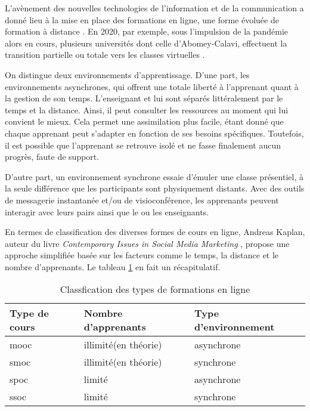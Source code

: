 L'avènement des nouvelles technologies de l’information et de la communication 
a donné lieu à la mise en place des formations en ligne, 
une forme évoluée de formation à distance \cite{online_learning}. 
En 2020, par exemple, sous l’impulsion de la pandémie alors en cours, 
plusieurs universités dont celle d’Abomey-Calavi, 
effectuent la transition partielle ou totale vers les classes virtuelles \cite{etudiant_dot_bj}.

On distingue deux environnements d’apprentissage. 
D’une part, les environnements asynchrones, qui offrent une totale liberté à l'apprenant quant à la gestion de son temps. 
L’enseignant et lui sont séparés littéralement par le temps et la distance. Ainsi, il peut consulter les ressources au moment qui lui convient le mieux. 
Cela permet une assimilation plus facile, étant donné que chaque apprenant peut s’adapter en fonction de ses besoins spécifiques. 
Toutefois, il est possible que l’apprenant se retrouve isolé et ne fasse finalement aucun progrès, faute de support.

D’autre part, un environnement synchrone essaie d'émuler une classe présentiel, 
à la seule différence que les participants sont physiquement distants. 
Avec des outils de messagerie instantanée et/ou de visioconférence, 
les apprenants peuvent interagir avec leurs pairs ainsi que le ou les enseignants.

En termes de classification des diverses formes de cours en ligne, Andreas Kaplan, 
auteur du livre \textit{Contemporary Issues in Social Media Marketing} \cite{andreas_kaplan_classfication}, propose une approche simplifiée basée sur les facteurs 
comme le temps, la distance et le nombre d’apprenants. 
Le tableau \ref{table:andreas_k_dot} en fait un récapitulatif.

\begin{table}[h!]
  \centering
\begin{tabular}{|l|l|l|}
  \hline
  Type de cours &  Nombre d’apprenants &  Type d’environnement \\
  \hline
  \acrfull{mooc} & illimité(en théorie) & asynchrone \\
  \hline
  \acrfull{smoc} & illimité(en théorie) & synchrone \\
  \hline
  \acrfull{spoc} & limité & asynchrone \\
  \hline
  \acrfull{ssoc} & limité & synchrone \\
  \hline
\end{tabular}
\caption{Classfication des types de formations en ligne}
\label{table:andreas_k_dot}
\end{table}

